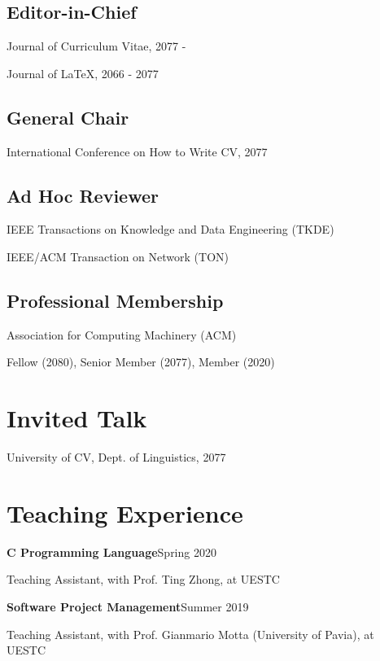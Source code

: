 \documentclass{article}
\newcommand{\cvsubsection}[1]{\subsection*{\hspace{1.45em}#1}}
\begin{document}
\cvsubsection{Editor-in-Chief}
\indent

Journal of Curriculum Vitae, 2077 -

Journal of \LaTeX, 2066 - 2077

\cvsubsection{General Chair}
\indent

International Conference on How to Write CV, 2077

\cvsubsection{Ad Hoc Reviewer}
\indent

IEEE Transactions on Knowledge and Data Engineering (TKDE)

IEEE/ACM Transaction on Network (TON)

\cvsubsection{Professional Membership}
\indent

Association for Computing Machinery (ACM)

\hspace{2em}Fellow (2080), Senior Member (2077), Member (2020)









\section*{Invited Talk}
\indent 

University of CV, Dept. of Linguistics, 2077 



\section*{Teaching Experience}
\indent

\textbf{C Programming Language}\hfill Spring 2020

\hspace{2em}Teaching Assistant, with Prof. Ting Zhong, at UESTC

\textbf{Software Project Management}\hfill Summer 2019

\hspace{2em}Teaching Assistant, with Prof. Gianmario Motta (University of Pavia), at UESTC





\end{document}
